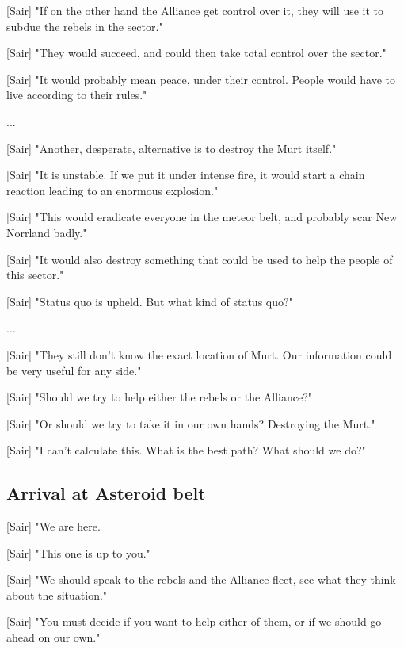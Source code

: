 \documentclass[a4paper,12pt]{article}
\begin{document}
[Sair] "If on the other hand the Alliance get control over it, they will use it to subdue the rebels in the sector."

[Sair] "They would succeed, and could then take total control over the sector." 

[Sair] "It would probably mean peace, under their control. People would have to live according to their rules."

...

[Sair] "Another, desperate, alternative is to destroy the Murt itself."

[Sair] "It is unstable. If we put it under intense fire, 
it would start a chain reaction leading to an enormous explosion."

[Sair] "This would eradicate everyone in the meteor belt, and probably scar New Norrland badly."

[Sair] "It would also destroy something that could be used to help the people of this sector."

[Sair] "Status quo is upheld. But what kind of status quo?"

...

[Sair] "They still don't know the exact location of Murt. Our information could be very
useful for any side."

[Sair] "Should we try to help either the rebels or the Alliance?"

[Sair] "Or should we try to take it in our own hands? Destroying the Murt."

[Sair] "I can't calculate this. What is the best path? What should we do?"


\subsection{Arrival at Asteroid belt}

[Sair] "We are here. 

[Sair] "This one is up to you." 

[Sair] "We should speak to the rebels and the Alliance fleet, see what they think about the
situation."

[Sair] "You must decide if you want to help either of them, or if we should go ahead on our own."
\end{document}
